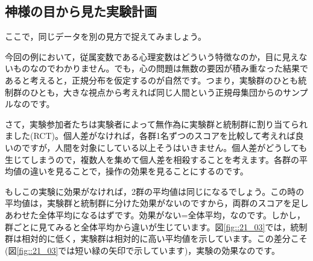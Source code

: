 \documentclass{ltjbook}
\begin{document}


\subsection{神様の目から見た実験計画}
ここで，同じデータを別の見方で捉えてみましょう。

今回の例において，従属変数である心理変数はどういう特徴なのか，目に見えないものなのでわかりません。でも，心の問題は無数の要因が積み重なった結果であると考えると，正規分布を仮定するのが自然です。つまり，実験群のひとも統制群のひとも，大きな視点から考えれば同じ人間という正規母集団からのサンプルなのです。

さて，実験参加者たちは実験者によって無作為に実験群と統制群に割り当てられました(RCT)。個人差がなければ，各群1名ずつのスコアを比較して考えれば良いのですが，人間を対象にしている以上そうはいきません。個人差がどうしても生じてしまうので，複数人を集めて個人差を相殺することを考えます。各群の平均値の違いを見ることで，操作の効果を見ることにするのです。

もしこの実験に効果がなければ，2群の平均値は同じになるでしょう。この時の平均値は，実験群と統制群に分けた効果がないのですから，両群のスコアを足しあわせた全体平均になるはずです。効果がない=全体平均，なのです。しかし，群ごとに見てみると全体平均から違いが生じています。図\ref{fig::21_03}では，統制群は相対的に低く，実験群は相対的に高い平均値を示しています。この差分こそ(図\ref{fig::21_03}では短い緑の矢印で示しています)，実験の効果なのです。
\end{document}
